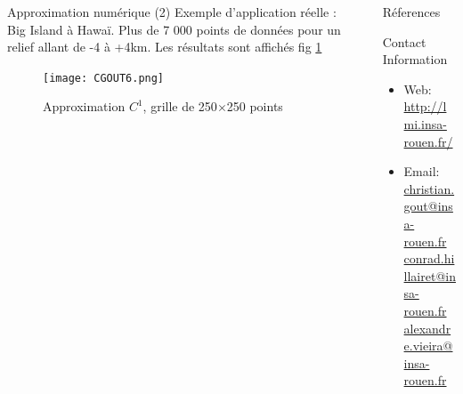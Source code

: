 \documentclass[final]{beamer}
\newlength{\sepwid}
\newlength{\onecolwid}
\newlength{\twocolwid}
\begin{document}
\begin{frame}[t]
\begin{columns}[t]
\begin{column}{\twocolwid}
\begin{columns}[t,totalwidth=\twocolwid]
\begin{column}{\onecolwid}
\begin{block}{Approximation numérique (2)}
\bigskip
Exemple d'application réelle : Big Island à Hawaï. Plus de 7 000 points de données pour un relief allant de -4 à +4km. Les résultats sont affichés fig \ref{figBI}
\begin{figure}
\centering
\texttt{[image: CGOUT6.png]}
\caption{Approximation $C^1$, grille de 250$\times$250 points}
\label{figBI}
\end{figure}

\end{block}
\end{column} %

\end{columns} %
\end{column} %

\begin{column}{\sepwid}\end{column} %

\begin{column}{\onecolwid} %



\begin{block}{Réferences}

\nocite{*} %
\small{
\vspace{0.75in}}

\end{block}



\begin{alertblock}{Contact Information}

\begin{itemize}
\item Web: \href{http://lmi.insa-rouen.fr/}{http://lmi.insa-rouen.fr/}
\item Email: \href{mailto:christian.gout@insa-rouen.fr}{christian.gout@insa-rouen.fr}\\
 \href{mailto:conrad.hillairet@insa-rouen.fr}{conrad.hillairet@insa-rouen.fr}\\
 \href{mailto:alexandre.vieira@insa-rouen.fr}{alexandre.vieira@insa-rouen.fr}
\end{itemize}


\end{alertblock}
\end{column}
\end{columns}
\end{frame}
\end{document}
